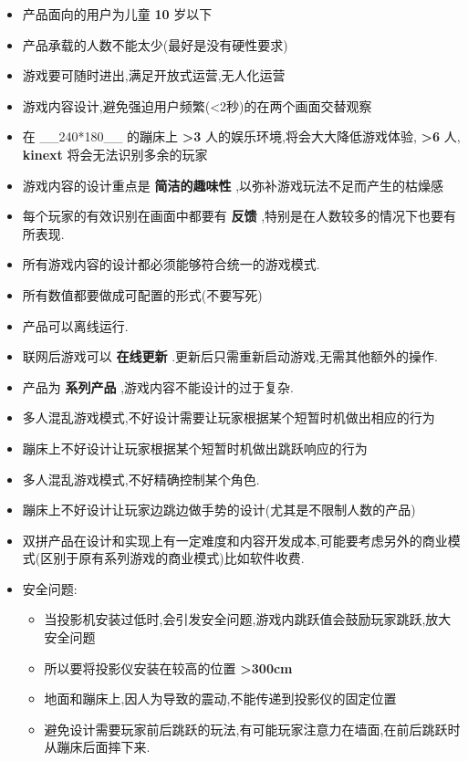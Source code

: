 \documentclass[11pt]{article}
\providecommand{\tightlist}{%
      \setlength{\itemsep}{0pt}\setlength{\parskip}{0pt}}
\begin{document}
    \begin{itemize}
\tightlist
\item
  产品面向的用户为儿童 \textbf{10} 岁以下
\item
  产品承载的人数不能太少(最好是没有硬性要求)
\item
  游戏要可随时进出,满足开放式运营,无人化运营
\item
  游戏内容设计,避免强迫用户频繁(\textless{}2秒)的在两个画面交替观察
\item
  在 \_\_240*180\_\_ 的蹦床上 \textbf{\textgreater{}3}
  人的娱乐环境,将会大大降低游戏体验, \textbf{\textgreater{}6} 人,
  \textbf{kinext} 将会无法识别多余的玩家
\item
  游戏内容的设计重点是 \textbf{简洁的趣味性}
  ,以弥补游戏玩法不足而产生的枯燥感
\item
  每个玩家的有效识别在画面中都要有 \textbf{反馈}
  ,特别是在人数较多的情况下也要有所表现.
\item
  所有游戏内容的设计都必须能够符合统一的游戏模式.
\item
  所有数值都要做成可配置的形式(不要写死)
\item
  产品可以离线运行.
\item
  联网后游戏可以 \textbf{在线更新}
  .更新后只需重新启动游戏,无需其他额外的操作.
\item
  产品为 \textbf{系列产品} ,游戏内容不能设计的过于复杂.
\item
  多人混乱游戏模式,不好设计需要让玩家根据某个短暂时机做出相应的行为
\item
  蹦床上不好设计让玩家根据某个短暂时机做出跳跃响应的行为
\item
  多人混乱游戏模式,不好精确控制某个角色.
\item
  蹦床上不好设计让玩家边跳边做手势的设计(尤其是不限制人数的产品)
\item
  双拼产品在设计和实现上有一定难度和内容开发成本,可能要考虑另外的商业模式(区别于原有系列游戏的商业模式)比如软件收费.
\item
  安全问题:

  \begin{itemize}
  \tightlist
  \item
    当投影机安装过低时,会引发安全问题,游戏内跳跃值会鼓励玩家跳跃,放大安全问题
  \item
    所以要将投影仪安装在较高的位置 \textbf{\textgreater{}300cm}
  \item
    地面和蹦床上,因人为导致的震动,不能传递到投影仪的固定位置
  \item
    避免设计需要玩家前后跳跃的玩法,有可能玩家注意力在墙面,在前后跳跃时从蹦床后面摔下来.
  \end{itemize}
\end{itemize}
\end{document}
